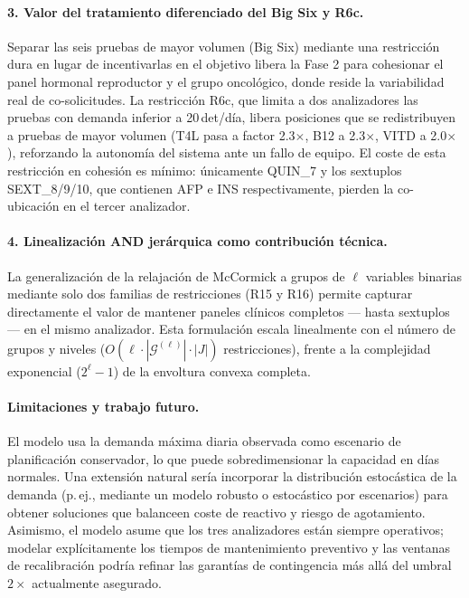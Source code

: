 \documentclass[12pt, a4paper]{article}
\begin{document}
\paragraph{3. Valor del tratamiento diferenciado del Big Six y R6c.}
Separar las seis pruebas de mayor volumen (Big Six) mediante una restricción dura en
lugar de incentivarlas en el objetivo libera la Fase 2 para cohesionar el panel
hormonal reproductor y el grupo oncológico, donde reside la variabilidad real de
co-solicitudes. La restricción R6c, que limita a dos analizadores las pruebas con
demanda inferior a 20\,det/día, libera posiciones que se redistribuyen a pruebas de
mayor volumen (T4L pasa a factor 2.3$\times$, B12 a 2.3$\times$, VITD a 2.0$\times$),
reforzando la autonomía del sistema ante un fallo de equipo. El coste de esta
restricción en cohesión es mínimo: únicamente QUIN\_7 y los sextuplos SEXT\_8/9/10,
que contienen AFP e INS respectivamente, pierden la co-ubicación en el tercer
analizador.

\paragraph{4. Linealización AND jerárquica como contribución técnica.}
La generalización de la relajación de McCormick a grupos de $\ell$ variables binarias
mediante solo dos familias de restricciones (R15 y R16) permite capturar directamente
el valor de mantener paneles clínicos completos --- hasta sextuplos --- en el mismo
analizador. Esta formulación escala linealmente con el número de grupos y niveles
($O(\ell \cdot |\mathcal{G}^{(\ell)}| \cdot |J|)$ restricciones), frente a la
complejidad exponencial ($2^{\ell}-1$) de la envoltura convexa completa.

\paragraph{Limitaciones y trabajo futuro.}
El modelo usa la demanda máxima diaria observada como escenario de planificación
conservador, lo que puede sobredimensionar la capacidad en días normales. Una extensión
natural sería incorporar la distribución estocástica de la demanda (p.\,ej., mediante un
modelo robusto o estocástico por escenarios) para obtener soluciones que balanceen
coste de reactivo y riesgo de agotamiento. Asimismo, el modelo asume que los tres
analizadores están siempre operativos; modelar explícitamente los tiempos de
mantenimiento preventivo y las ventanas de recalibración podría refinar las garantías
de contingencia más allá del umbral $2\times$ actualmente asegurado.

\end{document}
